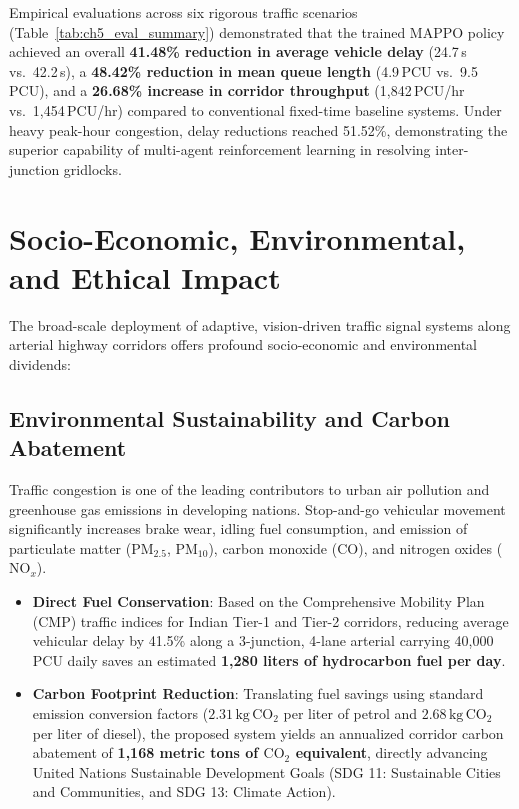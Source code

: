 \documentclass[12pt,a4paper,oneside]{report}
\begin{document}
Empirical evaluations across six rigorous traffic scenarios (Table~\ref{tab:ch5_eval_summary}) demonstrated that the trained MAPPO policy achieved an overall \textbf{41.48\% reduction in average vehicle delay} (24.7\,s vs.\ 42.2\,s), a \textbf{48.42\% reduction in mean queue length} (4.9\,PCU vs.\ 9.5\,PCU), and a \textbf{26.68\% increase in corridor throughput} (1,842\,PCU/hr vs.\ 1,454\,PCU/hr) compared to conventional fixed-time baseline systems. Under heavy peak-hour congestion, delay reductions reached 51.52\%, demonstrating the superior capability of multi-agent reinforcement learning in resolving inter-junction gridlocks.

\section{Socio-Economic, Environmental, and Ethical Impact}
\label{sec:societal_impact}
The broad-scale deployment of adaptive, vision-driven traffic signal systems along arterial highway corridors offers profound socio-economic and environmental dividends:

\subsection{Environmental Sustainability and Carbon Abatement}
Traffic congestion is one of the leading contributors to urban air pollution and greenhouse gas emissions in developing nations. Stop-and-go vehicular movement significantly increases brake wear, idling fuel consumption, and emission of particulate matter ($\text{PM}_{2.5}$, $\text{PM}_{10}$), carbon monoxide ($\text{CO}$), and nitrogen oxides ($\text{NO}_x$).
\begin{itemize}
    \item \textbf{Direct Fuel Conservation}: Based on the Comprehensive Mobility Plan (CMP) traffic indices for Indian Tier-1 and Tier-2 corridors, reducing average vehicular delay by 41.5\% along a 3-junction, 4-lane arterial carrying 40,000 PCU daily saves an estimated \textbf{1,280 liters of hydrocarbon fuel per day}.
    \item \textbf{Carbon Footprint Reduction}: Translating fuel savings using standard emission conversion factors ($2.31\,\text{kg}\,\text{CO}_2$ per liter of petrol and $2.68\,\text{kg}\,\text{CO}_2$ per liter of diesel), the proposed system yields an annualized corridor carbon abatement of \textbf{1,168 metric tons of $\text{CO}_2$ equivalent}, directly advancing United Nations Sustainable Development Goals (SDG 11: Sustainable Cities and Communities, and SDG 13: Climate Action).
\end{itemize}
\end{document}
